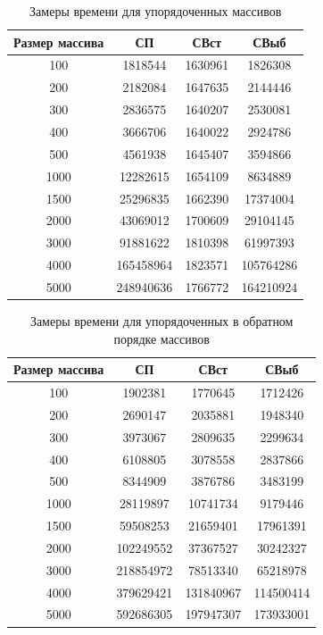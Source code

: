\documentclass[12pt]{report}
\begin{document}
\newpage
\begin{table}[h]
	\begin{center}
		\caption{\label{time1} Замеры времени для упорядоченных массивов}
		\begin{tabular}{|c c c c|} 
 			\hline
			Размер массива & СП & СВст & СВыб \\ [0.5ex] 
 			\hline\hline
 			100 & 1818544 & 1630961 & 1826308\\
 			\hline
 			200 & 2182084 & 1647635 & 2144446 \\
 			\hline
			300 & 2836575 & 1640207 & 2530081\\
			\hline
			400 & 3666706 & 1640022 & 2924786\\
			\hline
			500 & 4561938 & 1645407 & 3594866\\
			\hline
			1000 & 12282615 & 1654109 & 8634889\\
			\hline
			1500 & 25296835 & 1662390 & 17374004\\
			\hline
			2000 & 43069012 & 1700609 & 29104145\\
			\hline
			3000 & 91881622 & 1810398 & 61997393\\
			\hline
			4000 & 165458964 & 1823571 & 105764286\\
			\hline
			5000 & 248940636 & 1766772 & 164210924\\
			\hline
			\end{tabular}
	\end{center}
\end{table}

\newpage

\begin{table}[h]
	\begin{center}
		\caption{\label{time2} Замеры времени для упорядоченных в обратном порядке массивов}
		\begin{tabular}{|c c c c|} 
 			\hline
			Размер массива & СП & СВст & СВыб \\ [0.5ex] 
 			\hline\hline
 			100 & 1902381 & 1770645 & 1712426\\
 			\hline
 			200 & 2690147 & 2035881 & 1948340\\
 			\hline
			300 & 3973067 & 2809635 & 2299634\\
			\hline
			400 & 6108805 & 3078558 & 2837866\\
			\hline
			500 & 8344909 & 3876786 & 3483199\\
			\hline
			1000 & 28119897 & 10741734 & 9179446\\
			\hline
			1500 & 59508253 & 21659401 & 17961391\\
			\hline
			2000 & 102249552 & 37367527 & 30242327\\
			\hline
			3000 & 218854972 & 78513340 & 65218978\\
			\hline
			4000 & 379629421 & 131840967 & 114500414\\
			\hline
			5000 & 592686305 & 197947307	& 173933001\\
			\hline
			\end{tabular}
	\end{center}
\end{table}
\end{document}
